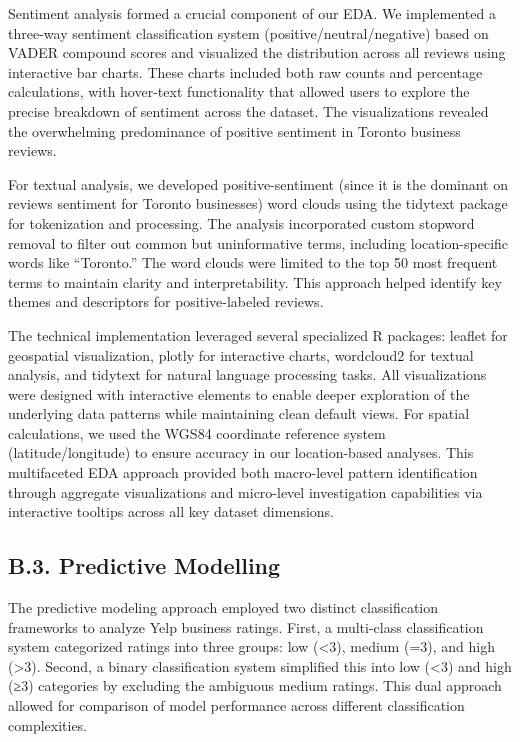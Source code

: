 \documentclass[
]{article}
\begin{document}
Sentiment analysis formed a crucial component of our EDA. We implemented
a three-way sentiment classification system (positive/neutral/negative)
based on VADER compound scores and visualized the distribution across
all reviews using interactive bar charts. These charts included both raw
counts and percentage calculations, with hover-text functionality that
allowed users to explore the precise breakdown of sentiment across the
dataset. The visualizations revealed the overwhelming predominance of
positive sentiment in Toronto business reviews.

For textual analysis, we developed positive-sentiment (since it is the
dominant on reviews sentiment for Toronto businesses) word clouds using
the tidytext package for tokenization and processing. The analysis
incorporated custom stopword removal to filter out common but
uninformative terms, including location-specific words like ``Toronto.''
The word clouds were limited to the top 50 most frequent terms to
maintain clarity and interpretability. This approach helped identify key
themes and descriptors for positive-labeled reviews.

The technical implementation leveraged several specialized R packages:
leaflet for geospatial visualization, plotly for interactive charts,
wordcloud2 for textual analysis, and tidytext for natural language
processing tasks. All visualizations were designed with interactive
elements to enable deeper exploration of the underlying data patterns
while maintaining clean default views. For spatial calculations, we used
the WGS84 coordinate reference system (latitude/longitude) to ensure
accuracy in our location-based analyses. This multifaceted EDA approach
provided both macro-level pattern identification through aggregate
visualizations and micro-level investigation capabilities via
interactive tooltips across all key dataset dimensions.

\subsection{B.3. Predictive Modelling}\label{b.3.-predictive-modelling}

The predictive modeling approach employed two distinct classification
frameworks to analyze Yelp business ratings. First, a multi-class
classification system categorized ratings into three groups: low
(\textless3), medium (=3), and high (\textgreater3). Second, a binary
classification system simplified this into low (\textless3) and high
(≥3) categories by excluding the ambiguous medium ratings. This dual
approach allowed for comparison of model performance across different
classification complexities.
\end{document}
